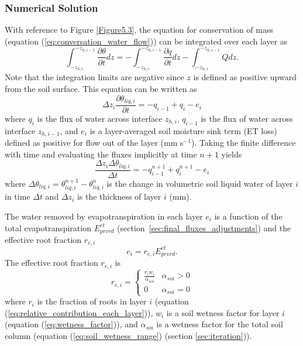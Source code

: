 \documentclass[12pt,authoryear]{elsarticle}
\numberwithin{equation}{section} %
\begin{document}
\subsubsection{Numerical Solution}
\label{sec:numerical_solution}
%
With reference to Figure \ref{Figure5.3}, the equation for conservation of mass (equation (\ref{eq:conversation_water_flow})) can be integrated over each layer as
\begin{equation}
\int_{-z_{h,i}}^{-z_{h,i-1}}\frac{\partial \theta}{\partial t}dz = -\int_{-z_{h,i}}^{-z_{h,i-1}}\frac{\partial q}{\partial t}dz-\int_{-z_{h,i}}^{-z_{h,i-1}}Qdz.
\end{equation}
Note that the integration limits are negative since $z$ is defined as positive upward from the soil surface. This equation can be written as
\begin{equation}
\Delta z_{i} \frac{\partial \theta_{liq,i}}{\partial t}= -q_{i-1}+q_{i}-e_{i}
\end{equation}
where $q_{i}$ is the flux of water across interface $z_{h,i}$, $q_{i-1}$ is the flux of water across interface $z_{h,i-1}$, and $e_{i}$ is a layer-averaged soil moisture sink term (ET loss) defined as positive for flow out of the layer (mm s$^{-1}$). Taking the finite difference with time and evaluating the fluxes implicitly at time $n+1$ yields
\begin{equation}
\label{eq:soil_water_fluxes}
\frac{\Delta z_{i}\Delta \theta_{liq,i}}{\Delta t} = -q_{i-1}^{n+1}+q_{i}^{n+1}-e_{i}
\end{equation}
where $\Delta \theta_{liq,i}=\theta_{liq,i}^{n+1}-\theta_{liq,i}^{n}$ is the change in volumetric soil liquid water of layer $i$ in time $\Delta t$ and $\Delta z_{i}$ is the thickness of layer $i$ (mm).

The water removed by evapotranspiration in each layer $e_{i}$ is a function of the total evapotranspiration $E_{prvrd}^{et}$ (section~\ref{sec:final_fluxes_adjustments}) and the effective root fraction $r_{e,i}$
\begin{equation}
e_{i} = r_{e,i}E_{prvrd}^{et}.
\end{equation}
The effective root fraction $r_{e,i}$ is
\begin{equation}
r_{e,i} = 
\begin{cases}
\frac{r_{i}w_{i}}{\alpha_{soi}} & \alpha_{soi}>0 \\
0 & \alpha_{soi}=0
\end{cases}
\end{equation}
where $r_{i}$ is the fraction of roots in layer $i$ (equation (\ref{eq:relative_contribution_each_layer})), $w_{i}$ is a soil wetness factor for layer $i$ (equation (\ref{eq:wetness_factor})), and $\alpha_{soi}$ is a wetness factor for the total soil column (equation (\ref{eq:soil_wetness_range}) (section \ref{sec:iteration})).
\end{document}
